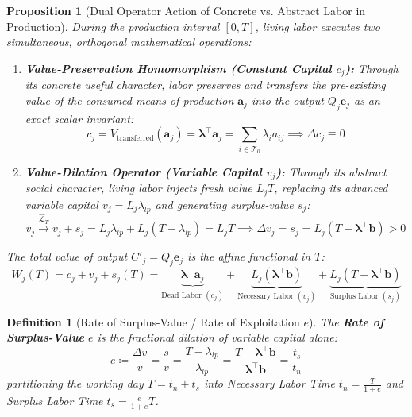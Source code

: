\documentclass[11pt,a4paper]{article}
\newtheorem{definition}{Definition}[section]
\newtheorem{proposition}{Proposition}[section]
\begin{document}
\begin{proposition}[Dual Operator Action of Concrete vs. Abstract Labor in Production]
During the production interval $[0, T]$, living labor executes two simultaneous, orthogonal mathematical operations:
\begin{enumerate}[label=(\roman*)]
    \item \textbf{Value-Preservation Homomorphism (Constant Capital $c_j$):} Through its \textit{concrete useful} character, labor preserves and transfers the pre-existing value of the consumed means of production $\mathbf{a}_j$ into the output $Q_j \mathbf{e}_j$ as an exact scalar invariant:
    \begin{equation}
        c_j = V_{\text{transferred}}(\mathbf{a}_j) = \boldsymbol{\lambda}^\top \mathbf{a}_j = \sum_{i \in \mathcal{T}_0} \lambda_i a_{ij} \implies \Delta c_j \equiv 0
    \end{equation}
    \item \textbf{Value-Dilation Operator (Variable Capital $v_j$):} Through its \textit{abstract social} character, living labor injects fresh value $L_j T$, replacing its advanced variable capital $v_j = L_j \lambda_{lp}$ and generating surplus-value $s_j$:
    \begin{equation}
        v_j \xrightarrow{\hat{\mathcal{L}}_T} v_j + s_j = L_j \lambda_{lp} + L_j \left(T - \lambda_{lp}\right) = L_j T \implies \Delta v_j = s_j = L_j \left(T - \boldsymbol{\lambda}^\top \mathbf{b}\right) > 0
    \end{equation}
\end{enumerate}
The total value of output $C'_j = Q_j \mathbf{e}_j$ is the affine functional in $T$:
\begin{equation}
    W_j(T) = c_j + v_j + s_j(T) = \underbrace{\boldsymbol{\lambda}^\top \mathbf{a}_j}_{\text{Dead Labor } (c_j)} + \underbrace{L_j \left(\boldsymbol{\lambda}^\top \mathbf{b}\right)}_{\text{Necessary Labor } (v_j)} + \underbrace{L_j \left(T - \boldsymbol{\lambda}^\top \mathbf{b}\right)}_{\text{Surplus Labor } (s_j)}
\end{equation}
\end{proposition}

\begin{definition}[Rate of Surplus-Value / Rate of Exploitation $e$]
The \textbf{Rate of Surplus-Value} $e$ is the fractional dilation of variable capital alone:
\begin{equation}
    e \coloneqq \frac{\Delta v}{v} = \frac{s}{v} = \frac{T - \lambda_{lp}}{\lambda_{lp}} = \frac{T - \boldsymbol{\lambda}^\top \mathbf{b}}{\boldsymbol{\lambda}^\top \mathbf{b}} = \frac{t_s}{t_n}
\end{equation}
partitioning the working day $T = t_n + t_s$ into Necessary Labor Time $t_n = \frac{T}{1+e}$ and Surplus Labor Time $t_s = \frac{e}{1+e}T$.
\end{definition}
\end{document}
